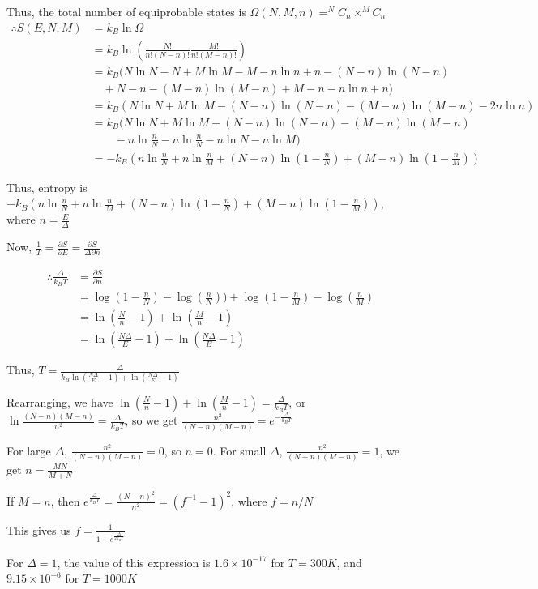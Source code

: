 \documentclass[12pt]{article}
\begin{document}
Thus, the total number of equiprobable states is $\Omega(N,M,n) = ^NC_n\times^MC_n$
\begin{align*}
\therefore S(E, N, M) &= k_B\ln \Omega\\
&= k_B\ln \left(\frac{N!}{n!(N-n)!}\frac{M!}{n!(M-n)!}\right)\\
&=k_B(N\ln N -N + M\ln M - M -n\ln n + n -(N-n)\ln(N-n)\\ &\quad+ N - n -(M-n)\ln(M-n) + M - n -n\ln n + n)\\
&= k_B(N\ln N + M\ln M  -(N-n)\ln(N-n)-(M-n)\ln(M-n)-2 n\ln n)\\
&= k_B(N\ln N + M\ln M  -(N-n)\ln(N-n)-(M-n)\ln(M-n)\\&\quad\quad-n\ln\frac{n}{N} -n\ln\frac{n}{N}-n\ln N - n\ln M)\\
&= -k_B \left(n\ln\frac n N + n\ln\frac n M + (N-n)\ln\left(1- \frac n N\right)+ (M-n)\ln\left(1- \frac n M\right) \right)
\end{align*}

Thus, entropy is $\boxed{-k_B \left(n\ln\frac n N + n\ln\frac n M + (N-n)\ln\left(1- \frac n N\right)+ (M-n)\ln\left(1- \frac n M\right) \right)}$, where $n=\frac E\Delta$


Now, $\frac 1 T = \frac{\partial S}{\partial E}= \frac{\partial S}{\Delta\partial n}$

\begin{align*}
\therefore \frac{\Delta}{k_B T}& = \frac{\partial S}{\partial n}\\
&=  \log \left(1-\frac{n}{N}\right)-\log \left(\frac{n}{N}\right))+\log \left(1-\frac{n}{M}\right)-\log \left(\frac{n}{M}\right)\\
&= \ln\left(\frac{N}{n} -1\right)+\ln\left(\frac{M}{n} -1\right)\\
&= \ln\left(\frac{N\Delta}{E}-1\right)+ \ln\left(\frac{N\Delta}{E}-1\right)
\end{align*}

Thus, $\boxed{T =\frac{\Delta}{k_B\ln\left(\frac{N\Delta}{E}-1\right)+ \ln\left(\frac{N\Delta}{E}-1\right)}}$

Rearranging, we have $\ln\left(\frac{N}{n} -1\right)+\ln\left(\frac{M}{n} -1\right) = \frac{\Delta}{k_B T}$, or $\ln\frac{(N-n)(M-n)}{n^2}=\frac{\Delta}{k_B T}$, so we get $\boxed{\frac{n^2}{(N-n)(M-n)} = e^{-\frac{\Delta}{k_B T}}}$

For large $\Delta$, $\frac{n^2}{(N-n)(M-n)} = 0$, so $\boxed{n = 0}$. For small $\Delta$, $\frac{n^2}{(N-n)(M-n)} = 1$, we get $\boxed{n = \frac{MN}{M+N}}$


If $M=n$, then $e^{\frac{\Delta}{k_B T}} = \frac{(N-n)^2}{n^2} = (f^{-1}-1)^2$, where $f=n/N$

This gives us $f =\frac{1}{1 + e^{\frac{\Delta}{2k_B T}}}$

For $\Delta=1$, the value of this expression is $\boxed{1.6\times 10^{-17}}$ for $T=300K$, and $\boxed{9.15 \times 10^{-6}}$ for $T=1000K$
\end{document}
